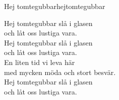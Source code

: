 \begin{song}{Hej tomtegubbar}{hejtomtegubbar}
\begin{vers}
Hej tomtegubbar slå i glasen\\
och låt oss lustiga vara.\\
Hej tomtegubbar slå i glasen\\
och låt oss lustiga vara.\\
En liten tid vi leva här\\
med mycken möda och stort besvär.\\
Hej tomtegubbar slå i glasen\\
och låt oss lustiga vara.\\
\end{vers}
\end{song}
